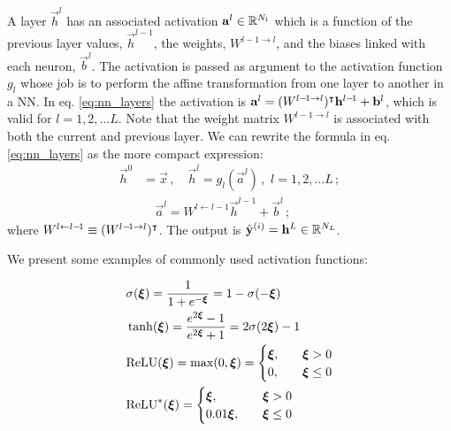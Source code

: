     A layer $\vec{h}^l$ has an associated activation $\vec{a}^l \in \RR[N_l]$ which is a function of the previous layer values, $\vec{h}^{l-\!1}$, the weights, $W^{l-\!1\to l}$, and the biases linked with each neuron, $\vec{b}^l$. The activation is passed as argument to the activation function $g_l$ whose job is to perform the affine transformation from one layer to another in a NN. In eq. \eqref{eq:nn_layers} the activation is $\vec{a}^l = (W^{l-\! 1\to l})\TT\vec{h}^{l -\!1} + \vec{b}^l$, which is valid for $l= 1, 2,\dots L$. Note that the weight matrix $W^{l-\! 1\to l}$ is associated with both the current and previous layer. We can rewrite the formula in eq. \eqref{eq:nn_layers} as the more compact expression:
    \begin{equation}\label{eq:NN_layers_compact}
        \begin{split}
            \vec{h}^0 &= \vec{x} \,,\quad \vec{h}^l =  g_l(\vec{a}^l)\,, \, \, l=1,2, \dots L \,; \\
            &\quad \vec{a}^l = W^{l\leftarrow l-\!1}\vec{h}^{l -\!1} + \vec{b}^l \,;
        \end{split}
    \end{equation}
    where $W^{l\leftarrow l-\!1} \equiv (W^{l-\! 1\to l})\TT$. The output is $\hat{\vec{y}}^{(i)} = \vec{h}^L \in \RR[N_L]$.

    We present some examples of commonly used activation functions:

    \begin{subequations}\label{eq:activation_functions}
        \begin{align}
            &\sigma(\svec{\xi}) = \frac{1}{1+e^{-\svec{\xi}}} = 1- \sigma(-\svec{\xi})\label{eq:sigmoid}\\
            &\tanh(\svec{\xi}) = \frac{e^{2\svec{\xi}}-1}{e^{2\svec{\xi}}+1} = 2\sigma(2\svec{\xi}) -1\label{eq:tanh} \\
            &\mathrm{ReLU}(\svec{\xi}) = \max(0,\svec{\xi}) = \begin{cases}
                \svec{\xi},\quad &\svec{\xi} >0 \\
                0,\quad &\svec{\xi} \leq 0
            \end{cases} \label{eq:relu}\\
            &\mathrm{ReLU}^*(\svec{\xi})  = \begin{cases}
                \svec{\xi},\quad &\svec{\xi} >0 \\
                0.01\svec{\xi},\quad &\svec{\xi} \leq 0
            \end{cases} \label{eq:leaky_relu}
        \end{align}
    \end{subequations}

